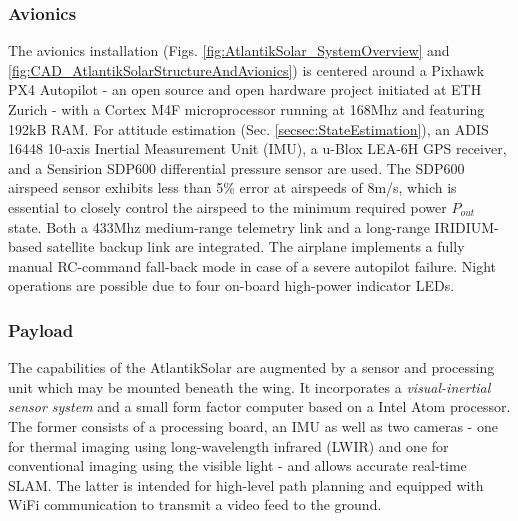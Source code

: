 \subsubsection{Avionics}
The avionics installation (Figs. \ref{fig:AtlantikSolar_SystemOverview} and \ref{fig:CAD_AtlantikSolarStructureAndAvionics}) is centered around a Pixhawk PX4 Autopilot - an open source and open hardware project initiated at ETH Zurich - with a Cortex M4F microprocessor running at 168Mhz and featuring 192kB RAM. For attitude estimation (Sec. \ref{secsec:StateEstimation}), an ADIS 16448 10-axis Inertial Measurement Unit (IMU), a u-Blox LEA-6H GPS receiver, and a Sensirion SDP600 differential pressure sensor are used. The SDP600 airspeed sensor exhibits less than 5\% error at airspeeds of 8m/s, which is essential to closely control the airspeed to the minimum required power $P_{out}$ state. Both a 433Mhz medium-range telemetry link and a long-range IRIDIUM-based satellite backup link are integrated. The airplane implements a fully manual RC-command fall-back mode in case of a severe autopilot failure. Night operations are possible due to four on-board high-power indicator LEDs.


\subsubsection{Payload}
The capabilities of the AtlantikSolar are augmented by a sensor and processing unit which may be mounted beneath the wing. It incorporates a \emph{visual-inertial sensor system} \cite{nikolic2014synchronized} and a small form factor computer based on a Intel Atom processor. The former consists of a processing board, an IMU as well as two cameras - one for thermal imaging using long-wavelength infrared (LWIR) and one for conventional imaging using the visible light - and allows accurate real-time SLAM. The latter is intended for high-level path planning and equipped with WiFi communication to transmit a video feed to the ground.
  
